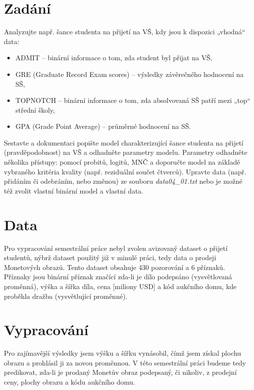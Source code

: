 \section{Zadání}

Analyzujte např. šance studenta na přijetí na VŠ, kdy jsou k dispozici „vhodná“ data:
\begin{itemize}
    \item ADMIT – binární informace o tom, zda student byl přijat na VŠ,
    \item GRE (Graduate Record Exam scores) – výsledky závěrečného hodnocení na SŠ,
    \item TOPNOTCH – binární informace o tom, zda absolvovaná SŠ patří mezi „top“ střední školy,
    \item GPA (Grade Point Average) – průměrné hodnocení na SŠ.
\end{itemize}

Sestavte a dokumentaci popište model charakterizující šance studenta na přijetí (pravděpodobnost) na VŠ a odhadněte parametry modelu.
Parametry odhadněte několika přístupy: pomocí probitů, logitů, MNČ a doporučte model na základě vybraného kritéria kvality (např. reziduální součet čtverců).
Upravte data (např. přidáním či odebráním, nebo změnou) ze souboru \textit{data04\_01.txt} nebo je možné též zvolit vlastní binární model a vlastní data.

\section{Data}

Pro vypracování semestrální práce nebyl zvolen avizovaný dataset o přijetí studentů, nýbrž dataset použitý již v minulé práci, tedy data o prodeji Monetových obrazů.
Tento dataset obsahuje 430 pozorování a 6 příznaků.
Příznaky jsou binární příznak značící zda-li je dílo podepsáno (vysvětlovaná proměnná), výška a šířka díla, cena [miliony USD] a kód aukčního domu, kde proběhla dražba (vysvětlující proměnné).

\section{Vypracování}

Pro zajímavější výsledky jsem výšku a šířku vynásobil, čímž jsem získal plochu obrazu a prohlásil ji za novou proměnnou.
V této semestrální práci budeme tedy predikovat, zda-li je prodaný Monetův obraz podepsaný, či nikoliv, z prodejní ceny, plochy obrazu a kódu aukčního domu.

